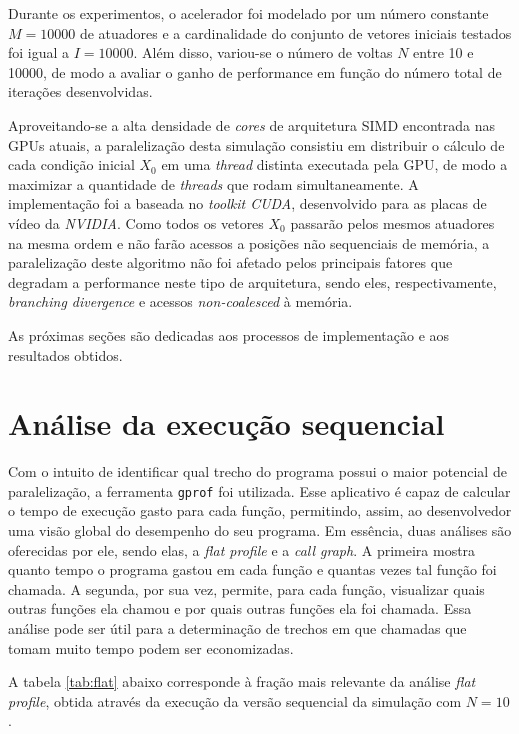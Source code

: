 \documentclass[12pt]{article}
\begin{document}
Durante os experimentos, o acelerador foi modelado por um número
constante \(M = 10000\) de atuadores e a cardinalidade do conjunto de vetores
iniciais testados foi igual a \(I = 10000\). Além disso, variou-se o número de
voltas \(N\) entre 10 e 10000, de modo a avaliar o ganho de performance em
função do número total de iterações desenvolvidas.

Aproveitando-se a alta densidade de \textit{cores} de arquitetura SIMD
encontrada nas GPUs atuais, a paralelização desta simulação consistiu em
distribuir o cálculo de cada condição inicial \(X_0\) em uma \textit{thread}
distinta executada pela GPU, de modo a maximizar a quantidade de
\textit{threads} que rodam simultaneamente. A implementação foi a baseada no
\textit{toolkit CUDA}, desenvolvido para as placas de vídeo da \textit{NVIDIA}.
Como todos os vetores \(X_0\) passarão pelos mesmos atuadores na mesma ordem e
não farão acessos a posições não sequenciais de memória, a paralelização deste
algoritmo não foi afetado pelos principais fatores que degradam a performance
neste tipo de arquitetura, sendo eles, respectivamente, \textit{branching
divergence} e acessos \textit{non-coalesced} à memória.

As próximas seções são dedicadas aos processos de implementação e aos resultados
obtidos.

\section {Análise da execução sequencial}

Com o intuito de identificar qual trecho do programa possui o maior potencial de
paralelização, a ferramenta \texttt{gprof} foi utilizada. Esse aplicativo é
capaz de calcular o tempo de execução gasto para cada função, permitindo, assim,
ao desenvolvedor uma visão global do desempenho do seu programa. Em
essência, duas análises são oferecidas por ele, sendo elas, a \textit {flat
profile} e a \textit{call graph}. A primeira mostra quanto tempo o programa
gastou em cada função e quantas vezes tal função foi chamada. A segunda, por sua
vez, permite, para cada função, visualizar quais outras funções ela chamou
e por quais outras funções ela foi chamada. Essa análise pode ser útil para a
determinação de trechos em que chamadas que tomam muito tempo podem ser
economizadas.

A tabela \ref{tab:flat} abaixo corresponde à fração mais relevante da análise
\textit{flat profile}, obtida através da execução da versão sequencial da
simulação com \(N = 10\). 
\end{document}
